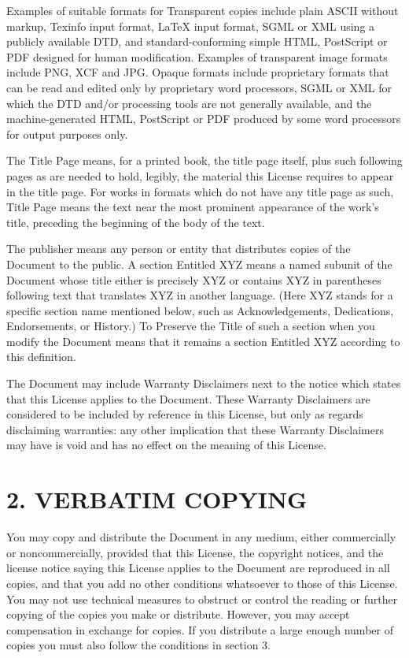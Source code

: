 \documentclass[captions=tableheading]{scrbook}
\begin{document}
\begin{example}
Examples of suitable formats for Transparent copies include plain ASCII without markup, Texinfo input format, \LaTeX{} input format, SGML or XML using a publicly available DTD, and standard-conforming simple HTML, PostScript or PDF designed for human modification. Examples of transparent image formats include PNG, XCF and JPG. Opaque formats include proprietary formats that can be read and edited only by proprietary word processors, SGML or XML for which the DTD and/or processing tools are not generally available, and the machine-generated HTML, PostScript or PDF produced by some word processors for output purposes only.

The Title Page means, for a printed book, the title page itself, plus such following pages as are needed to hold, legibly, the material this License requires to appear in the title page. For works in formats which do not have any title page as such, Title Page means the text near the most prominent appearance of the work's title, preceding the beginning of the body of the text.

The publisher means any person or entity that distributes copies of the Document to the public.  A section Entitled XYZ means a named subunit of the Document whose title either is precisely XYZ or contains XYZ in parentheses following text that translates XYZ in another language. (Here XYZ stands for a specific section name mentioned below, such as Acknowledgements, Dedications, Endorsements, or History.) To Preserve the Title of such a section when you modify the Document means that it remains a section Entitled XYZ according to this definition.

The Document may include Warranty Disclaimers next to the notice which states that this License applies to the Document. These Warranty Disclaimers are considered to be included by reference in this License, but only as regards disclaiming warranties: any other implication that these Warranty Disclaimers may have is void and has no effect on the meaning of this License.
\section{2. VERBATIM COPYING}
\label{sec-18-3}


You may copy and distribute the Document in any medium, either commercially or noncommercially, provided that this License, the copyright notices, and the license notice saying this License applies to the Document are reproduced in all copies, and that you add no other conditions whatsoever to those of this License. You may not use technical measures to obstruct or control the reading or further copying of the copies you make or distribute. However, you may accept compensation in exchange for copies. If you distribute a large enough number of copies you must also follow the conditions in section 3.


\end{example}
\end{document}
